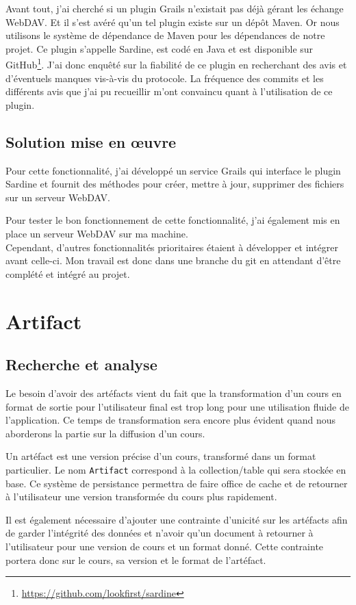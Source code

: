 Avant tout, j'ai cherché si un plugin Grails n'existait pas déjà gérant les
échange WebDAV. Et il s'est avéré qu'un tel plugin existe sur un dépôt Maven. Or
nous utilisons le système de dépendance de Maven pour les dépendances de notre
projet. Ce plugin s'appelle Sardine, est codé en Java et est disponible sur
GitHub\footnote{\url{https://github.com/lookfirst/sardine}}. J'ai donc enquêté
sur la fiabilité de ce plugin en recherchant des avis et d'éventuels manques
vis-à-vis du protocole. La fréquence des commits et les différents avis que j'ai
pu recueillir m'ont convaincu quant à l'utilisation de ce plugin.

\subsection{Solution mise en \oe uvre}
Pour cette fonctionnalité, j'ai développé un service Grails qui interface le
plugin Sardine et fournit des méthodes pour créer, mettre à jour, supprimer
des fichiers sur un serveur WebDAV.

Pour tester le bon fonctionnement de cette fonctionnalité, j'ai également mis en
place un serveur WebDAV sur ma machine.\\

Cependant, d'autres fonctionnalités prioritaires étaient à développer et
intégrer avant celle-ci. Mon travail est donc dans une branche du git en
attendant d'être complété et intégré au projet.

\section{Artifact}
\subsection{Recherche et analyse}
Le besoin d'avoir des artéfacts vient du fait que la transformation d'un cours en
format de sortie pour l'utilisateur final est trop long pour une utilisation
fluide de l'application. Ce temps de transformation sera encore plus évident
quand nous aborderons la partie sur la diffusion d'un cours.

Un artéfact est une version précise d'un cours, transformé dans un format
particulier. Le nom {\tt Artifact} correspond à la collection/table qui sera
stockée en base. Ce système de persistance permettra de faire office de cache et
de retourner à l'utilisateur une version transformée du cours plus rapidement.

Il est également nécessaire d'ajouter une contrainte d'unicité sur les artéfacts
afin de garder l'intégrité des données et n'avoir qu'un document à retourner à
l'utilisateur pour une version de cours et un format donné. Cette contrainte
portera donc sur le cours, sa version et le format de l'artéfact.

